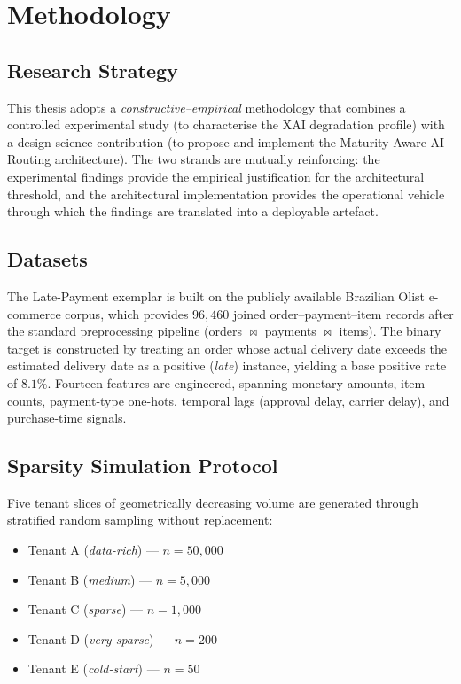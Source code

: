 \chapter{Methodology}
\label{ch:methodology}

\section{Research Strategy}
\label{sec:methodology_strategy}

This thesis adopts a \emph{constructive--empirical} methodology that combines a controlled experimental study (to characterise the XAI degradation profile) with a design-science contribution (to propose and implement the Maturity-Aware AI Routing architecture). The two strands are mutually reinforcing: the experimental findings provide the empirical justification for the architectural threshold, and the architectural implementation provides the operational vehicle through which the findings are translated into a deployable artefact.

\section{Datasets}
\label{sec:methodology_data}

The Late-Payment exemplar is built on the publicly available Brazilian Olist e-commerce corpus, which provides $96{,}460$ joined order--payment--item records after the standard preprocessing pipeline (orders $\bowtie$ payments $\bowtie$ items). The binary target is constructed by treating an order whose actual delivery date exceeds the estimated delivery date as a positive (\emph{late}) instance, yielding a base positive rate of $8.1\%$. Fourteen features are engineered, spanning monetary amounts, item counts, payment-type one-hots, temporal lags (approval delay, carrier delay), and purchase-time signals.

\section{Sparsity Simulation Protocol}
\label{sec:methodology_sparsity}

Five tenant slices of geometrically decreasing volume are generated through stratified random sampling without replacement:

\begin{itemize}
  \item Tenant A (\emph{data-rich}) --- $n = 50{,}000$
  \item Tenant B (\emph{medium})    --- $n = 5{,}000$
  \item Tenant C (\emph{sparse})    --- $n = 1{,}000$
  \item Tenant D (\emph{very sparse}) --- $n = 200$
  \item Tenant E (\emph{cold-start}) --- $n = 50$
\end{itemize}

